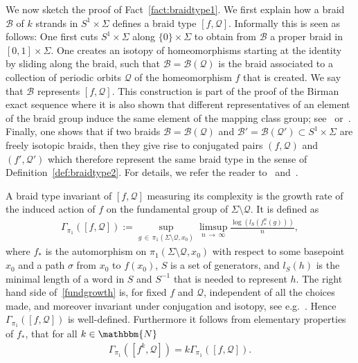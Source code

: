 \documentclass[AHL,Unicode,longabstracts,published]{cedram}
\newcommand{\N}{\mathbbm{N}}
\newcommand{\clB}{\mathcal{B}}
\newcommand{\clQ}{\mathcal{Q}}
\begin{document}
We now sketch the proof of Fact~\ref{fact:braidtype1}. We first explain how a braid $\clB$ of $k$ strands in $S^1 \times \Sigma$ defines a braid type $[f,\clQ]$. Informally this is seen as follows: One first cuts $S^1 \times \Sigma$ along $\{0\} \times \Sigma$ to obtain from $\clB$ a proper braid in $[0,1] \times \Sigma$. One creates an isotopy of homeomorphisms starting at the identity by sliding along the braid, such that $\clB= \clB(\clQ)$ is the braid associated to a collection of periodic orbits $\clQ$ of the homeomorphism $f$ that is created. We say that $\clB$ represents $[f,\clQ]$. This construction is part of the proof of the Birman exact sequence where it is also shown that different representatives of an element of the braid group induce the same element of the mapping class group; see~\cite[Chapter~4]{Birman} or~\cite[Section~2]{Matsuoka}. Finally, one shows that if two braids $\clB= \clB(\clQ)$ and $\clB'=\clB(\clQ')\subset S^1 \times \Sigma$ are freely isotopic braids, then they give rise to conjugated pairs $(f,\clQ)$ and $(f',\clQ')$ which therefore represent the same braid type in the sense of Definition~\ref{def:braidtype2}. For details, we refer the reader to~\cite[Section~2]{Matsuoka} and~\cite[Section~4]{Boyland}.



A braid type invariant of $[f,\clQ]$ measuring its complexity is the growth rate of the induced action of $f$ on the fundamental group of $\Sigma \setminus {\clQ}$. It is defined as
\begin{align}\label{fundgrowth}
\Gamma_{\pi_1}([f,\clQ]) := \sup_{g\, \in \,\pi_1(\Sigma\setminus {{\clQ}},x_0)} \limsup_{n\,\to\,\infty} \frac{\log\left(l_S\left(f^n_*(g)\right)\right)}{n},
\end{align}
where $f_*$ is the automorphism on $\pi_1(\Sigma\setminus {{\clQ}},x_0)$ with respect to some basepoint $x_0$ and a path $\sigma$ from $x_0$ to $f(x_0)$, $S$ is a set of generators, and $l_S(h)$ is the minimal length of a word in $S$ and $S^{-1}$ that is needed to represent $h$. The right hand side of~\eqref{fundgrowth} is, for fixed $f$ and $\clQ$, independent of all the choices made, and moreover invariant under conjugation and isotopy, see e.g.~\cite{Bowen}. Hence $\Gamma_{\pi_1}([f,\clQ])$ is well-defined. Furthermore it follows from elementary properties of $f_*$, that for all $k\in \N$
\begin{align}
\Gamma_{\pi_1}\left(\left[f^k,\clQ\right]\right) = k\Gamma_{\pi_1}([f,\clQ]).
\end{align}
\end{document}
